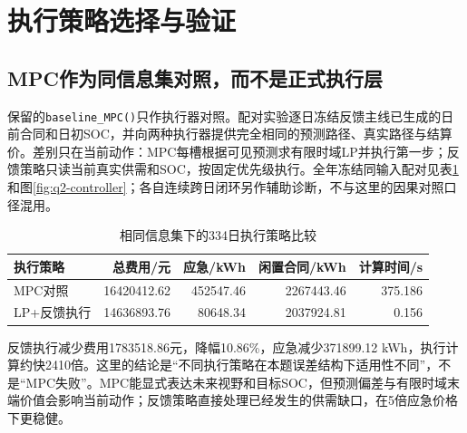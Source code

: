 \documentclass[UTF8,fontset=fandol,a4paper,11pt]{ctexart}
\begin{document}
\begin{table}[H]
\centering
\caption{四个题面主分支的334日结果}
\label{tab:main}
\end{table}

\section{执行策略选择与验证}

\subsection{MPC作为同信息集对照，而不是正式执行层}

保留的\texttt{baseline\_MPC()}只作执行器对照。配对实验逐日冻结反馈主线已生成的日前合同和日初SOC，并向两种执行器提供完全相同的预测路径、真实路径与结算价。差别只在当前动作：MPC每槽根据可见预测求有限时域LP并执行第一步；反馈策略只读当前真实供需和SOC，按固定优先级执行。全年冻结同输入配对见表\ref{tab:controller}和图\ref{fig:q2-controller}；各自连续跨日闭环另作辅助诊断，不与这里的因果对照口径混用。

\begin{table}[H]
\centering
\caption{相同信息集下的334日执行策略比较}
\label{tab:controller}
\begin{tabular}{lrrrr}
\toprule
执行策略 & 总费用/元 & 应急/kWh & 闲置合同/kWh & 计算时间/s\\
\midrule
MPC对照 & 16420412.62 & 452547.46 & 2267443.46 & 375.186\\
LP+反馈执行 & 14636893.76 & 80648.34 & 2037924.81 & 0.156\\
\bottomrule
\end{tabular}
\end{table}

反馈执行减少费用1783518.86元，降幅10.86\%，应急减少371899.12 kWh，执行计算约快2410倍。这里的结论是“不同执行策略在本题误差结构下适用性不同”，不是“MPC失败”。MPC能显式表达未来视野和目标SOC，但预测偏差与有限时域末端价值会影响当前动作；反馈策略直接处理已经发生的供需缺口，在5倍应急价格下更稳健。
\end{document}
